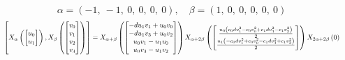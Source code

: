 \documentclass[11pt]{article}
\theoremstyle{definition}
\begin{document}
\[
\alpha = \left( -1, \  -1, \  0, \  0, \  0, \  0\right), \quad \beta = \left( 1, \  0, \  0, \  0, \  0, \  0\right)
\]
\[
\scaletoalign{\textwidth}{\left[ X_{\alpha}\left(\left[\begin{matrix}u_{0}\\u_{1}\end{matrix}\right]\right), X_{\beta}\left(\left[\begin{matrix}v_{0}\\v_{1}\\v_{2}\\v_{3}\end{matrix}\right]\right) \right] = X_{\alpha + \beta}\left(\left[\begin{matrix}- d u_{1} v_{1} + u_{0} v_{0}\\- d u_{1} v_{3} + u_{0} v_{2}\\u_{0} v_{1} - u_{1} v_{0}\\u_{0} v_{3} - u_{1} v_{2}\end{matrix}\right]\right) X_{\alpha + 2\beta}\left(\left[\begin{matrix}\frac{u_{0} \left(c_{0} d v_{1}^{2} - c_{0} v_{0}^{2} + c_{1} d v_{3}^{2} - c_{1} v_{2}^{2}\right)}{2}\\\frac{u_{1} \left(- c_{0} d v_{1}^{2} + c_{0} v_{0}^{2} - c_{1} d v_{3}^{2} + c_{1} v_{2}^{2}\right)}{2}\end{matrix}\right]\right) X_{2\alpha + 2\beta}\left(0\right)}
\]
\end{document}
